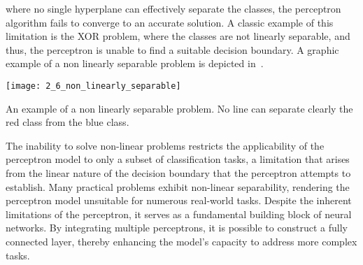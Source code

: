 where no single hyperplane can effectively separate the classes, the perceptron
algorithm fails to converge to an accurate solution. A classic example of this
limitation is the XOR problem, where the classes are not linearly separable, and
thus, the perceptron is unable to find a suitable decision boundary. A graphic
example of a non linearly separable problem is depicted in~.
\begin{marginfigure}[*-6]
  \texttt{[image: 2\_6\_non\_linearly\_separable]}
  \caption[Non Linearly Separable Problem]{
  An example of a non linearly separable problem. No line can separate clearly
  the red class from the blue class.
  }
\end{marginfigure}
The inability to solve non-linear problems restricts the applicability of the
perceptron model to only a subset of classification tasks, a limitation that
arises from the linear nature of the decision boundary that the perceptron
attempts to establish.
Many practical problems exhibit non-linear separability, rendering the perceptron
model unsuitable for numerous real-world tasks. Despite the inherent limitations
of the perceptron, it serves as a fundamental building block of neural networks.
By integrating multiple perceptrons, it is possible to construct a fully
connected layer, thereby enhancing the model's capacity to address more complex
tasks.

